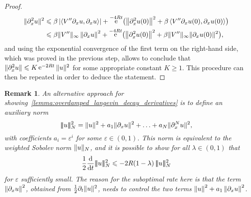 \documentclass[11pt,a4paper]{article}
\DeclareMathOperator{\e}{e}
\theoremstyle{plain}
\newtheorem{remark}{Remark}[section]
\numberwithin{equation}{section}
\renewcommand{\leq}{\leqslant}
\renewcommand{\geq}{\geqslant}
\begin{document}
\begin{proof}
    \begin{align*}
        \norm*{\partial_x^2 u}^2
        &\leq \beta \abs{\ip{V'' \partial_x u}{\partial_x u}} + \e^{-4Rt} \bigl( \norm{\partial_x^2 u(0)}^2 + \beta \ip{V'' \partial_x u(0)}{\partial_x u(0)} \bigr) \\
        &\leq \beta \norm*{V''}_{\infty} \norm{\partial_x u}^2 + \e^{-4Rt} \bigl( \norm{\partial_x^2 u(0)}^2 + \beta \norm*{V''}_{\infty} \norm*{\partial_x u(0)}^2 \bigr),
    \end{align*}
    and using the exponential convergence of the first term on the right-hand side,
    which was proved in the previous step,
    allows to conclude that $\norm*{\partial_x^2 u} \leq K \e^{-2 Rt} \norm*{u}^2$ for some appropriate constant $K \geq 1$.
    This procedure can then be repeated in order to deduce the statement.
\end{proof}

\newcommand{\auxnorm}[1]{|\!|\!| #1 |\!|\!|}
\begin{remark}
    An alternative approach for showing~\cref{lemma:overdamped_langevin_decay_derivatives} is
    to define an auxiliary norm
    \[
        \auxnorm{u}_N^2 = \norm*{u}^2 + a_1 \norm*{\partial_x u}^2 + \dotsc + a_N \norm*{\partial_x^N u}^2,
    \]
    with coefficients $a_i = \varepsilon^i$ for some $\varepsilon \in (0, 1)$.
    This norm is equivalent to the weighted Sobolev norm $\norm*{u}_N$,
    and it is possible to show for all $\lambda \in (0, 1)$ that
    \[
        \frac{1}{2}\derivative*{1}{t} \auxnorm{u}_N^2 \leq - 2 R(1 - \lambda) \, \auxnorm{u}_N^2
    \]
    for $\varepsilon$ sufficiently small.
    The reason for the suboptimal rate here is that the term $\norm{\partial_x u}^2$,
    obtained from $\frac{1}{2} \partial_t \norm*{u}^2$,
    needs to control the two terms $\norm{u}^2 + a_1 \norm{\partial_x u}^2$.
\end{remark}
\end{document}
